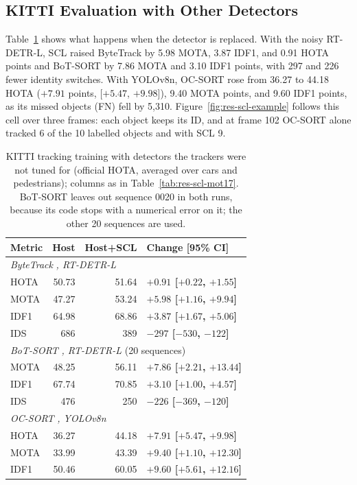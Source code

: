\subsection{KITTI Evaluation with Other Detectors}\label{sec:res-scl-kitti}
Table~\ref{tab:res-scl-kitti} shows what happens when the detector is replaced. With the noisy RT-DETR-L, SCL raised ByteTrack by 5.98 MOTA, 3.87 IDF1, and 0.91 HOTA points and BoT-SORT by 7.86 MOTA and 3.10 IDF1 points, with 297 and 226 fewer identity switches. With YOLOv8n, OC-SORT rose from 36.27 to 44.18 HOTA ($+7.91$ points, [$+5.47$, $+9.98$]), 9.40 MOTA points, and 9.60 IDF1 points, as its missed objects (FN) fell by 5,310. Figure~\ref{fig:res-scl-example} follows this cell over three frames: each object keeps its ID, and at frame 102 OC-SORT alone tracked 6 of the 10 labelled objects and with SCL 9.

\begin{table}[tbp]
\centering
\caption{KITTI tracking training with detectors the trackers were not tuned for (official HOTA, averaged over cars and pedestrians); columns as in Table~\ref{tab:res-scl-mot17}. BoT-SORT leaves out sequence 0020 in both runs, because its code stops with a numerical error on it; the other 20 sequences are used.}
\label{tab:res-scl-kitti}
\begin{tabular}{lrrl}
\toprule
Metric & Host & Host+SCL & Change [95\% CI]\\
\midrule
\multicolumn{4}{l}{\textit{ByteTrack} \cite{zhang2022bytetrack}\textit{, RT-DETR-L}}\\
\quad HOTA & 50.73 & 51.64 & \textbf{$+0.91$ [$+0.22$, $+1.55$]}\\
\quad MOTA & 47.27 & 53.24 & \textbf{$+5.98$ [$+1.16$, $+9.94$]}\\
\quad IDF1 & 64.98 & 68.86 & \textbf{$+3.87$ [$+1.67$, $+5.06$]}\\
\quad IDS & 686 & 389 & \textbf{$-297$ [$-530$, $-122$]}\\
\multicolumn{4}{l}{\textit{BoT-SORT} \cite{aharon2022botsort}\textit{, RT-DETR-L} (20 sequences)}\\
\quad MOTA & 48.25 & 56.11 & \textbf{$+7.86$ [$+2.21$, $+13.44$]}\\
\quad IDF1 & 67.74 & 70.85 & \textbf{$+3.10$ [$+1.00$, $+4.57$]}\\
\quad IDS & 476 & 250 & \textbf{$-226$ [$-369$, $-120$]}\\
\multicolumn{4}{l}{\textit{OC-SORT} \cite{cao2023ocsort}\textit{, YOLOv8n}}\\
\quad HOTA & 36.27 & 44.18 & \textbf{$+7.91$ [$+5.47$, $+9.98$]}\\
\quad MOTA & 33.99 & 43.39 & \textbf{$+9.40$ [$+1.10$, $+12.30$]}\\
\quad IDF1 & 50.46 & 60.05 & \textbf{$+9.60$ [$+5.61$, $+12.16$]}\\
\bottomrule
\end{tabular}
\end{table}

